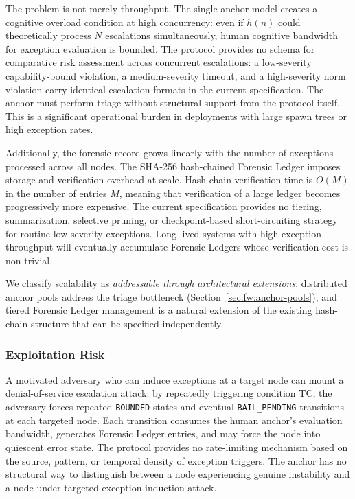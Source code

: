 The problem is not merely throughput. The single-anchor model creates a cognitive overload condition at high concurrency: even if $h(n)$ could theoretically process $N$ escalations simultaneously, human cognitive bandwidth for exception evaluation is bounded. The protocol provides no schema for comparative risk assessment across concurrent escalations: a low-severity capability-bound violation, a medium-severity timeout, and a high-severity norm violation carry identical escalation formats in the current specification. The anchor must perform triage without structural support from the protocol itself. This is a significant operational burden in deployments with large spawn trees or high exception rates.

Additionally, the forensic record grows linearly with the number of exceptions processed across all nodes. The SHA-256 hash-chained Forensic Ledger imposes storage and verification overhead at scale. Hash-chain verification time is $O(M)$ in the number of entries $M$, meaning that verification of a large ledger becomes progressively more expensive. The current specification provides no tiering, summarization, selective pruning, or checkpoint-based short-circuiting strategy for routine low-severity exceptions. Long-lived systems with high exception throughput will eventually accumulate Forensic Ledgers whose verification cost is non-trivial.

We classify scalability as \emph{addressable through architectural extensions}: distributed anchor pools address the triage bottleneck (Section~\ref{sec:fw:anchor-pools}), and tiered Forensic Ledger management is a natural extension of the existing hash-chain structure that can be specified independently.

\subsubsection{Exploitation Risk}
\label{sec:lim:exploitation}

A motivated adversary who can induce exceptions at a target \bxthree{} node can mount a denial-of-service escalation attack: by repeatedly triggering condition TC, the adversary forces repeated \texttt{BOUNDED} states and eventual \texttt{BAIL\_PENDING} transitions at each targeted node. Each transition consumes the human anchor's evaluation bandwidth, generates Forensic Ledger entries, and may force the node into quiescent error state. The protocol provides no rate-limiting mechanism based on the source, pattern, or temporal density of exception triggers. The anchor has no structural way to distinguish between a node experiencing genuine instability and a node under targeted exception-induction attack.

